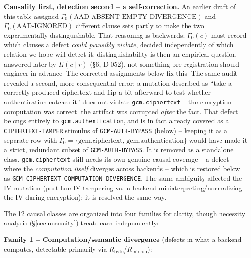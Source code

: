 \documentclass[11pt,a4paper]{article}
\begin{document}
\textbf{Causality first, detection second -- a self-correction.} An earlier draft of this table assigned $\Gamma_0(\text{AAD-ABSENT-EMPTY-DIVERGENCE})$ and $\Gamma_0(\text{AAD-IGNORED})$ different clause sets partly to make the two experimentally distinguishable. That reasoning is backwards: $\Gamma_0(c)$ must record which clauses a defect \emph{could plausibly violate}, decided independently of which relation we hope will detect it; distinguishability is then an empirical question answered later by $H(c\mid r)$ (\S6, D-052), not something pre-registration should engineer in advance. The corrected assignments below fix this. The same audit revealed a second, more consequential error: a mutation described as ``take a correctly-produced ciphertext and flip a bit afterward to test whether authentication catches it'' does not violate \texttt{gcm.ciphertext} -- the encryption computation was correct; the artifact was corrupted \emph{after} the fact. That defect belongs entirely to \texttt{gcm.authentication}, and is in fact already covered as a \texttt{CIPHERTEXT-\allowbreak TAMPER} stimulus of \texttt{GCM-AUTH-}\allowbreak\texttt{BYPASS} (below) -- keeping it as a separate row with $\Gamma_0=\{\text{gcm.ciphertext, gcm.authentication}\}$ would have made it a strict, redundant subset of \texttt{GCM-AUTH-}\allowbreak\texttt{BYPASS}. It is removed as a standalone class. \texttt{gcm.ciphertext} still needs its own genuine causal coverage -- a defect where the \emph{computation itself} diverges across backends -- which is restored below as \texttt{GCM-CIPHERTEXT-COMPUTATION-DIVERGENCE}. The same ambiguity affected the IV mutation (post-hoc IV tampering vs.\ a backend misinterpreting/normalizing the IV during encryption); it is resolved the same way.

The 12 causal classes are organized into four families for clarity, though necessity analysis (\S\ref{sec:necessity}) treats each independently:

\textbf{Family 1 -- Computation/semantic divergence} (defects in what a backend computes, detectable primarily via $R_{\text{byte}}$/$R_{\text{interop}}$):
\end{document}

